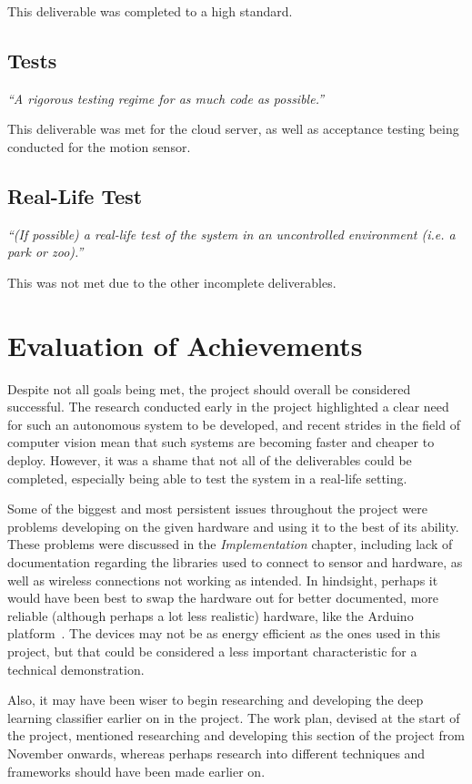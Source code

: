 \noindent
This deliverable was completed to a high standard.

\subsection{Tests}
\textit{``A rigorous testing regime for as much code as possible.''}

\noindent
This deliverable was met for the cloud server, as well as acceptance testing being conducted for the motion sensor.

\subsection{Real-Life Test}
\textit{``(If possible) a real-life test of the system in an uncontrolled
environment (i.e. a park or zoo).''}

\noindent
This was not met due to the other incomplete deliverables.

\section{Evaluation of Achievements}
Despite not all goals being met, the project should overall be considered
successful. The research conducted early in the project highlighted a clear
need for such an autonomous system to be developed, and recent strides in the
field of computer vision mean that such systems are becoming faster and
cheaper to deploy. However, it was a shame that not all of the deliverables
could be completed, especially being able to test the system in a real-life
setting.

Some of the biggest and most persistent issues throughout the project were
problems developing on the given hardware and using it to the best of its
ability. These problems were discussed in the \textit{Implementation}
chapter, including lack of documentation regarding the libraries used to
connect to sensor and hardware, as well as wireless connections not working
as intended. In hindsight, perhaps it would have been best to swap the
hardware out for better documented, more reliable (although perhaps a lot
less realistic) hardware, like the Arduino platform~\cite{arduino}. The
devices may not be as energy efficient as the ones used in this project, but
that could be considered a less important characteristic for a technical
demonstration.

Also, it may have been wiser to begin researching and developing the deep
learning classifier earlier on in the project. The work plan, devised at the
start of the project, mentioned researching and developing this section of
the project from November onwards, whereas perhaps research into different
techniques and frameworks should have been made earlier on.

